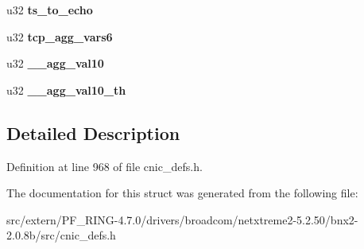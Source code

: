 \begin{DoxyCompactItemize}
\item 
\hypertarget{structxstorm__tcp__tcp__ag__context__section_a92e7a27ed88ef1b7d2a1945802a37abe}{
u32 {\bfseries ts\_\-to\_\-echo}}
\label{structxstorm__tcp__tcp__ag__context__section_a92e7a27ed88ef1b7d2a1945802a37abe}

\item 
\hypertarget{structxstorm__tcp__tcp__ag__context__section_a6d0d8841c228ba35058db44ec1706c56}{
u32 {\bfseries tcp\_\-agg\_\-vars6}}
\label{structxstorm__tcp__tcp__ag__context__section_a6d0d8841c228ba35058db44ec1706c56}

\item 
\hypertarget{structxstorm__tcp__tcp__ag__context__section_a62e112518a16b03aa53b8d538c4e368e}{
u32 {\bfseries \_\-\_\-agg\_\-val10}}
\label{structxstorm__tcp__tcp__ag__context__section_a62e112518a16b03aa53b8d538c4e368e}

\item 
\hypertarget{structxstorm__tcp__tcp__ag__context__section_a1bb84167f7ac8d1b1b9e58d6fa26ecd8}{
u32 {\bfseries \_\-\_\-agg\_\-val10\_\-th}}
\label{structxstorm__tcp__tcp__ag__context__section_a1bb84167f7ac8d1b1b9e58d6fa26ecd8}

\end{DoxyCompactItemize}


\subsection{Detailed Description}


Definition at line 968 of file cnic\_\-defs.h.



The documentation for this struct was generated from the following file:\begin{DoxyCompactItemize}
\item 
src/extern/PF\_\-RING-\/4.7.0/drivers/broadcom/netxtreme2-\/5.2.50/bnx2-\/2.0.8b/src/cnic\_\-defs.h\end{DoxyCompactItemize}
